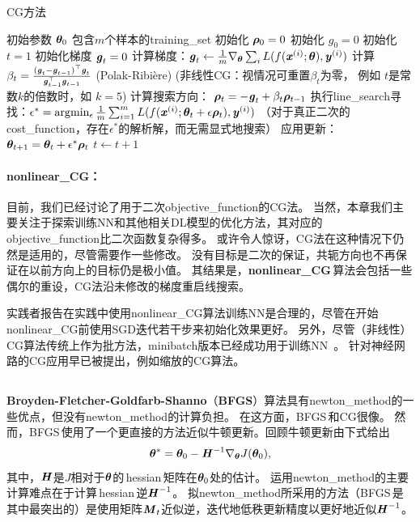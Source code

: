 \begin{algorithm}[ht]
\caption{\gls{CG}方法}
\label{alg:cg}
\begin{algorithmic}
\REQUIRE 初始参数 $\boldsymbol{\theta}_{0}$
\REQUIRE 包含$m$个样本的\gls{training_set}
\STATE 初始化 $\boldsymbol{\rho}_{0} = 0$
\STATE 初始化 $g_0 = 0$
\STATE 初始化 $t = 1$
    \STATE 初始化梯度 ${\boldsymbol{\mathit{g}}}_{t} = 0$
    \STATE 计算梯度：$\boldsymbol{\mathit{g}}_{t} \leftarrow
         \frac{1}{m}\nabla_{\boldsymbol{\theta}} \sum_i L(f(\boldsymbol{\mathit{x}}^{(i)};\boldsymbol{\theta}),\boldsymbol{\mathit{y}}^{(i)})$ 
    \STATE 计算 $\beta_{t} = \frac{(\boldsymbol{\mathit{g}}_{t}-\boldsymbol{\mathit{g}}_{t-1})^\top \boldsymbol{\mathit{g}}_{t}}{\boldsymbol{\mathit{g}}_{t-1}^\top \boldsymbol{\mathit{g}}_{t-1}}$  (Polak-Ribi\`{e}re)
    \STATE (非线性\gls{CG}：视情况可重置$\beta_{t}$为零，
           例如  $t$是常数$k$的倍数时，如 $k=5$)
    \STATE 计算搜索方向： $\boldsymbol{\rho}_{t} = -\boldsymbol{\mathit{g}}_{t} + \beta_{t} \boldsymbol{\rho}_{t-1}$ 
    \STATE 执行\gls{line_search}寻找：$\epsilon^{*} = \arg\!\min_{\epsilon}
    \frac{1}{m} \sum_{i=1}^{m}L(f(\boldsymbol{\mathit{x}}^{(i)};\boldsymbol{\theta}_t + \epsilon \boldsymbol{\rho}_t),\boldsymbol{\mathit{y}}^{(i)})$ 
    \STATE （对于真正二次的\gls{cost_function}，存在$\epsilon^*$的解析解，而无需显式地搜索）
    \STATE 应用更新：$\boldsymbol{\theta}_{t+1} = \boldsymbol{\theta}_{t}+ \epsilon^{*} \boldsymbol{\rho}_{t}$
    \STATE $t \leftarrow t + 1$
\ENDWHILE
\end{algorithmic}
\end{algorithm}


\paragraph{\gls{nonlinear_CG}：}
目前，我们已经讨论了用于二次\gls{objective_function}的\gls{CG}法。
当然，本章我们主要关注于探索训练\gls{NN}和其他相关\gls{DL}模型的优化方法，其对应的\gls{objective_function}比二次函数复杂得多。
或许令人惊讶，\gls{CG}法在这种情况下仍然是适用的，尽管需要作一些修改。
没有目标是二次的保证，共轭方向也不再保证在以前方向上的目标仍是极小值。
其结果是，\textbf{\gls{nonlinear_CG}}\,算法会包括一些偶尔的重设，\gls{CG}法沿未修改的梯度重启线搜索。


实践者报告在实践中使用\gls{nonlinear_CG}算法训练\gls{NN}是合理的，尽管在开始\gls{nonlinear_CG}前使用\gls{SGD}迭代若干步来初始化效果更好。
另外，尽管（非线性）\gls{CG}算法传统上作为批方法，\gls{minibatch}版本已经成功用于训练\gls{NN}~\citep{Le-ICML2011}。
针对神经网路的\gls{CG}应用早已被提出，例如缩放的\gls{CG}算法\citep{Moller}。

\subsection{}
\label{sec:bfgs}
\textbf{Broyden-Fletcher-Goldfarb-Shanno}（\textbf{\gls{BFGS}}）算法具有\gls{newton_method}的一些优点，但没有\gls{newton_method}的计算负担。
在这方面，\gls{BFGS}\,和CG很像。
然而，\gls{BFGS}\,使用了一个更直接的方法近似牛顿更新。回顾牛顿更新由下式给出
\begin{equation}
    \boldsymbol{\theta}^* = \boldsymbol{\theta}_0 - \boldsymbol{\mathit{H}}^{-1} \nabla_{\boldsymbol{\theta}} J(\boldsymbol{\theta}_0),
\end{equation}
其中，$\boldsymbol{\mathit{H}}$是$J$相对于$\boldsymbol{\theta}$的\,\gls{hessian}\,矩阵在$\boldsymbol{\theta}_0$处的估计。
运用\gls{newton_method}的主要计算难点在于计算\,\gls{hessian}\,逆$\boldsymbol{\mathit{H}}^{-1}$。
拟\gls{newton_method}所采用的方法（\gls{BFGS}\,是其中最突出的）是使用矩阵$\boldsymbol{\mathit{M}}_t$近似逆，迭代地低秩更新精度以更好地近似$\boldsymbol{\mathit{H}}^{-1}$。

